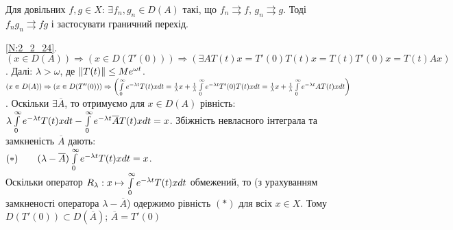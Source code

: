 Для довільних $f, g \in X$: $\exists f_n, g_n \in D(A)$ такі, що $f_n \rightrightarrows f$, 
$g_n \rightrightarrows g$. Тоді $f_n g_n \rightrightarrows fg$ і застосувати граничний перехід.

\noindent\ref{N:2_2_24}. $(x\in D(A)) \Rightarrow \left( x\in D(T'(0))\right)
\Rightarrow (\exists AT(t)x = T'(0)T(t)x = T(t)T'(0)x = T(t)Ax)$.
Далі: $\lambda > \omega$, де $\left\lVert T(t)\right\rVert \leq M e^{\omega t}$.
$(x\in D(A)) \Rightarrow
\left( x\in D(T''(0))\right)\Rightarrow \left( \int\limits_{0}^{\infty} e^{-\lambda t}T(t)x dt =
\frac{1}{\lambda}x + \frac{1}{\lambda} \int\limits_{0}^{\infty} e^{-\lambda t}T'(0)T(t)x dt =
\frac{1}{\lambda}x + \frac{1}{\lambda} \int\limits_{0}^{\infty} e^{-\lambda t}AT(t)x dt
\right)$.
Оскільки $\exists \overline{A}$, то отримуємо для $x \in D(A)$ рівність:
$\lambda \int\limits_{0}^{\infty} e^{-\lambda t}T(t)x dt - \int\limits_{0}^{\infty} e^{-\lambda t}\overline{A}T(t)x dt = x$.
Збіжність невласного інтеграла та замкненість $\overline{A}$ дають:\\
$(*)\qquad (\lambda - \overline{A})\int\limits_{0}^{\infty} e^{-\lambda t}T(t)x dt = x$.\\
Оскільки оператор
$R_\lambda: x \mapsto \int\limits_{0}^{\infty} e^{-\lambda t}T(t)x dt$ обмежений,
то (з урахуванням замкненості оператора $\lambda - \overline{A}$) одержимо рівність $(*)$
для всіх $x \in X$. Тому $D(T'(0))\subset D(\overline{A})$; $\overline{A} = T'(0)$
